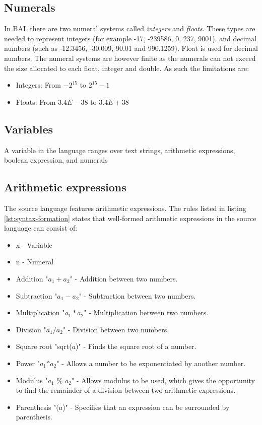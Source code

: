 \subsection{Numerals}
In BAL there are two numeral systems called \textit{integers} and \textit{floats}. These types are needed to represent integers (for example -17, -239586, 0, 237, 9001). and decimal numbers (such as -12.3456, -30.009, 90.01 and 990.1259). Float is used for decimal numbers. The numeral systems are however finite as the numerals can not exceed the size allocated to each float, integer and double. As such the limitations are:
\begin{itemize}
\item Integers: From $-2^{15}$ to $2^{15}-1$
\item Floats: From $3.4E-38$ to $3.4E+38$
\end{itemize}

\subsection{Variables}
A variable in the language ranges over text strings, arithmetic expressions, boolean expression, and numerals


\subsection{Arithmetic expressions}
The source language features arithmetic expressions. The rules listed in listing \ref{lst:syntax-formation} states that well-formed arithmetic expressions in the source language can consist of:
\begin{itemize}
	\item x - Variable
	\item n - Numeral
	\item Addition "$a_1 + a_2$" - Addition between two numbers.
	\item Subtraction "$a_1 - a_2$" - Subtraction between two numbers.
	\item Multiplication "$a_1 * a_2$" - Multiplication between two numbers.
	\item Division "$a_1 / a_2$" - Division between two numbers.
	\item Square root "sqrt($a$)" - Finds the square root of a number.
	\item Power "$a_1$\texttt{\^{}}$a_2$" - Allows a number to be exponentiated by another number.
	\item Modulus "$a_1$ \% $a_2$" - Allows modulus to be used, which gives the opportunity to find the remainder of a division between two arithmetic expressions.
	\item Parenthesis "($a$)" - Specifies that an expression can be surrounded by parenthesis.
\end{itemize}

